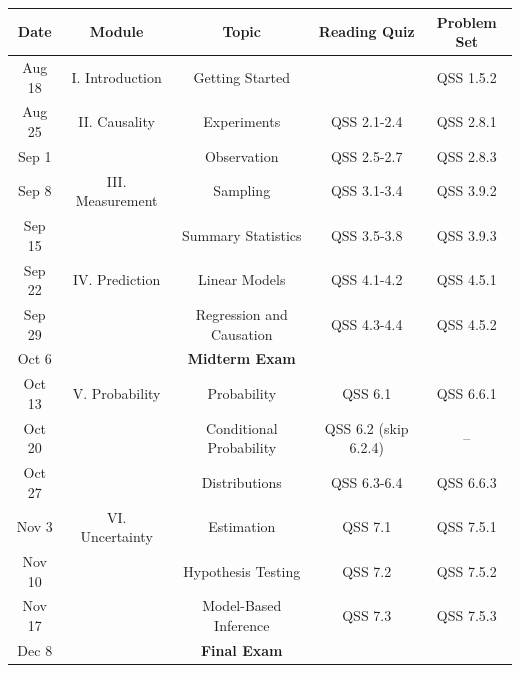 \documentclass[11pt, letterpaper]{article}
\begin{document}
\renewcommand{\arraystretch}{1.1}
\begin{tabular}{|c|c|c|c|c|}
	\hline
	\textbf{Date} & \textbf{Module} & \textbf{Topic} & \textbf{Reading Quiz} & \textbf{Problem Set} \\
	\hline
	Aug 18 & I. Introduction & Getting Started & & QSS 1.5.2  \\
	\hline
	Aug 25 & II. Causality & Experiments & QSS 2.1-2.4 & QSS 2.8.1  \\
	\hline
	Sep 1 &  & Observation & QSS 2.5-2.7 & QSS 2.8.3 \\
	\hline
	Sep 8 & III. Measurement & Sampling & QSS 3.1-3.4 & QSS 3.9.2 \\
	\hline
	Sep 15 &  & Summary Statistics & QSS 3.5-3.8 & QSS 3.9.3 \\
	\hline
	Sep 22 & IV. Prediction & Linear Models & QSS 4.1-4.2 & QSS 4.5.1 \\
	\hline
	Sep 29 &  & Regression and Causation & QSS 4.3-4.4 & QSS 4.5.2 \\
	\hline
	Oct 6 &  & \textbf{Midterm Exam} & & \\
	\hline
	Oct 13 & V. Probability & Probability & QSS 6.1 & QSS 6.6.1  \\
	\hline
	Oct 20 &  & Conditional Probability & QSS 6.2 (skip 6.2.4) & -- \\
	\hline
	Oct 27 &  & Distributions & QSS 6.3-6.4 & QSS 6.6.3 \\
	\hline
	Nov 3 & VI. Uncertainty & Estimation & QSS 7.1 & QSS 7.5.1 \\
	\hline
	Nov 10 &  & Hypothesis Testing & QSS 7.2 & QSS 7.5.2 \\
	\hline
	Nov 17 &  & Model-Based Inference & QSS 7.3 &  QSS 7.5.3 \\
	\hline
	Dec 8 & & \textbf{Final Exam} & & \\
	\hline
\end{tabular}


\end{document}
